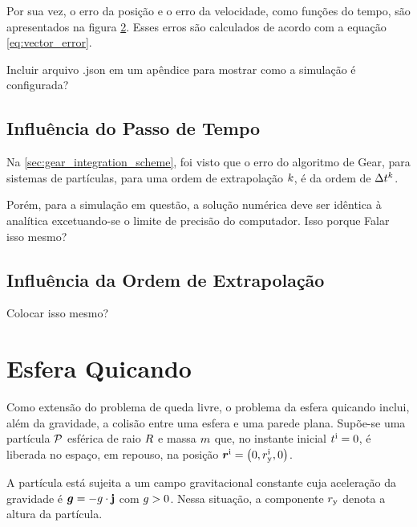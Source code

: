 \begin{figure}[h]
{\begin{center}
\begin{subfigure}[t]{\smallresultsfigwidth}
			\caption{}
			\label{subfig:velocity_error}
		\end{subfigure}
	\end{center}
	}
	\label{fig:falling_sphere_error}
	\sourceMe
\end{figure}

Por sua vez, o erro da posição e o erro da velocidade, como funções do tempo, são apresentados na figura \ref{fig:falling_sphere_error}. Esses erros são calculados de acordo com a equação \eqref{eq:vector_error}.

\alert{Incluir arquivo .json em um apêndice para mostrar como a simulação é configurada?}

\subsection{Influência do Passo de Tempo}

Na \autoref{sec:gear_integration_scheme}, foi visto que o erro do algoritmo de Gear, para sistemas de partículas, para uma ordem de extrapolação \(k\), é da ordem de \(\Delta t_{}^{k}\).

Porém, para a simulação em questão, a solução numérica deve ser idêntica à analítica excetuando-se o limite de precisão do computador. Isso porque \alert{Falar isso mesmo?}

\subsection{Influência da Ordem de Extrapolação} \alert{Colocar isso mesmo?}

\section{Esfera Quicando}

Como extensão do problema de queda livre, o problema da esfera quicando inclui, além da gravidade, a colisão entre uma esfera e uma parede plana. Supõe-se uma partícula \(\particle\) esférica de raio \(R\) e massa \(m\) que, no instante inicial \(t_{}^{\text{i}}=0\), é liberada no espaço, em repouso, na posição \(\initial{\position} = \explicitVector{0}{\initial{\yComponent{\positionScalar}}}{0}\).

A partícula está sujeita a um campo gravitacional constante cuja aceleração da gravidade é \(\bm{g} = -g\cdot\mathbf{j}\) com \(g>0\). Nessa situação, a componente \({r}_{\text{y}}\) denota a altura da partícula.


